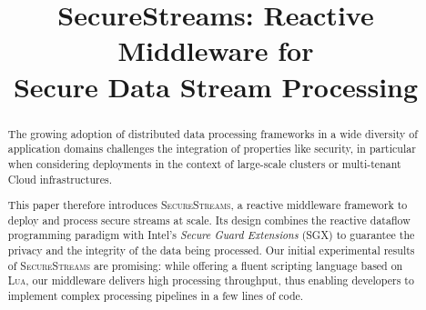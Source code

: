 \documentclass{sig-alternate}
\newcommand{\SYS}{\textsc{SecureStreams}\xspace}
\begin{document}
\title{SecureStreams: Reactive Middleware for\\Secure Data Stream Processing}
\date{}

\author{
}

\maketitle


\begin{abstract}
The growing adoption of distributed data processing frameworks in a wide diversity of application domains challenges the integration of properties like security, in particular when considering deployments in the context of large-scale clusters or multi-tenant Cloud infrastructures.

This paper therefore introduces \SYS{}, a reactive middleware framework to deploy and process secure streams at scale.
Its design combines the reactive dataflow programming paradigm with Intel's \emph{Secure Guard Extensions} (SGX) to guarantee the privacy and the integrity of the data being processed.
Our initial experimental results of \SYS{} are promising: while offering a fluent scripting language based on \textsc{Lua}, our middleware delivers high processing throughput, thus enabling developers to implement complex processing pipelines in a few lines of code.
\end{abstract}













\end{document}
